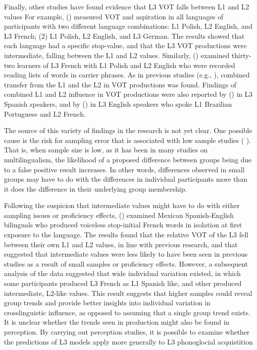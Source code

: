 \documentclass[preprints]{Definitions/mdpi}
\begin{document}
Finally, other studies have found evidence that L3 VOT falls between L1 and L2 values
For example, \citeauthor{wrembel_vot_2014} (\citeyear{wrembel_vot_2014}) measured VOT and aspiration in all languages of participants with two different language combinations: L1 Polish, L2 English, and L3 French; (2) L1 Polish, L2 English, and L3 German.
The results showed that each language had a specific stop-value, and that the L3 VOT productions were intermediate, falling between the L1 and L2 values.
Similarly, \citeauthor{wrembel_cross-linguistic_2011} (\citeyear{wrembel_cross-linguistic_2011}) examined thirty-two learners of L3 French with L1 Polish and L2 English who were recorded reading lists of words in carrier phrases.
As in previous studies (e.g., \citeauthor{wrembel_vot_2014} \citeyear{wrembel_vot_2014}), combined transfer from the L1 and the L2 in VOT productions was found.
Findings of combined L1 and L2 influence in VOT productions were also reported by \citeauthor{wunder_phonological_2010} (\citeyear{wunder_phonological_2010}) in L3 Spanish speakers, and by \citeauthor{blank_transferencia_2009} (\citeyear{blank_transferencia_2009}) in L3 English speakers who spoke L1 Brazilian Portuguese and L2 French.

The source of this variety of findings in the research is not yet clear.
One possible cause is the risk for sampling error that is associated with low sample studies (\citeauthor{brysbaert_power_2020} \citeyear{brysbaert_power_2020}).
That is, when sample size is low, as it has been in many studies on multilingualism, the likelihood of a proposed difference between groups being due to a false positive result increases.
In other words, differences observed in small groups may have to do with the differences in individual participants more than it does the difference in their underlying group membership.

Following the suspicion that intermediate values might have to do with either sampling issues or proficiency effects, \citeauthor{parrish_l3_vot_2022} (\citeyear{parrish_l3_vot_2022}) examined Mexican Spanish-English bilinguals who produced voiceless stop-initial French words in isolation at first exposure to the language.
The results found that the relative VOT of the L3 fell between their own L1 and L2 values, in line with previous research, and that suggested that intermediate values were less likely to have been seen in previous studies as a result of small samples or proficiency effects.
However, a subsequent analysis of the data suggested that wide individual variation existed, in which some participants produced L3 French as L1 Spanish like, and other produced intermediate, L2-like values.
This result suggests that higher samples could reveal group trends and provide better insights into individual variation in crosslinguistic influence, as opposed to assuming that a single group trend exists.\\
It is unclear whether the trends seen in production might also be found in perception.
By carrying out perception studies, it is possible to examine whether the predictions of L3 models apply more generally to L3 phonoglocial acquistition
\end{document}
